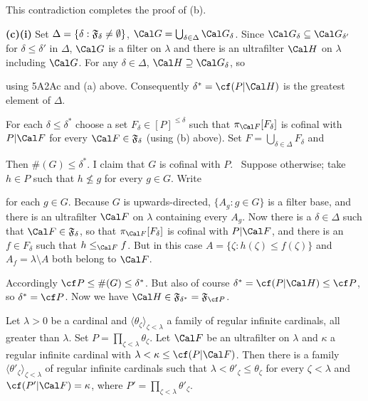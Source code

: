 {This contradiction completes the proof of (b).

\medskip

{\bf (c)(i)} Set $\Delta=\{\delta:\frak F_{\delta}\ne\emptyset\}$,
$\Cal G=\bigcup_{\delta\in\Delta}\Cal G_{\delta}$.   Since
$\Cal G_{\delta}\subseteq\Cal G_{\delta'}$ for $\delta\le\delta'$ in
$\Delta$,
$\Cal G$ is a filter on $\lambda$ and there is an ultrafilter
$\Cal H$ on $\lambda$ including $\Cal G$.   For any
$\delta\in\Delta$, $\Cal H\supseteq\Cal G_{\delta}$, so


\noindent using 5A2Ac and (a) above.   Consequently
$\delta^*=\cf(P|\Cal H)$ is the greatest element of $\Delta$.

\medskip

 For each $\delta\le\delta^*$ choose a set
$F_{\delta}\in[P]^{\le\delta}$ such that $\pi_{\Cal F}[F_{\delta}]$ is
cofinal with
$P|\Cal F$ for every $\Cal F\in\frak F_{\delta}$ (using (b) above).
Set $F=\bigcup_{\delta\in\Delta}F_{\delta}$ and


\noindent Then $\#(G)\le\delta^*$.   I claim that $G$ is cofinal with
$P$.   \Prf\Quer\ Suppose otherwise;  take $h\in P$ such
that $h\not\le g$ for every $g\in G$.   Write


\noindent for each $g\in G$.   Because $G$ is upwards-directed,
$\{A_g:g\in G\}$ is a filter base, and there is an ultrafilter $\Cal
F$
on $\lambda$ containing every $A_g$.   Now there is a
$\delta\in\Delta$
such that $\Cal F\in\frak F_{\delta}$, so that
$\pi_{\Cal F}[F_{\delta}]$
is cofinal with $P|\Cal F$, and there is an $f\in F_{\delta}$
such that $h\le_{\Cal F}f$.   But in this
case $A=\{\zeta:h(\zeta)\le f(\zeta)\}$
and $A_f=\lambda\setminus A$ both belong to $\Cal F$.\ \Bang\Qed

\medskip

Accordingly $\cf P\le\#(G)\le\delta^*$.   But also of course
$\delta^*=\cf(P|\Cal H)\le\cf P$,
so $\delta^*=\cf P$.   Now we
have $\Cal H\in\frak F_{\delta^*}=\frak F_{\cf P}$.
}%

 Let $\lambda>0$ be a cardinal and
$\langle\theta_{\zeta}\rangle_{\zeta<\lambda}$ a family of regular
infinite cardinals, all greater than $\lambda$.   Set
$P=\prod_{\zeta<\lambda}\theta_{\zeta}$.
Let $\Cal F$ be an ultrafilter on $\lambda$
and $\kappa$ a regular
infinite cardinal with $\lambda<\kappa\le\cf(P|\Cal F)$.
Then there is a
family $\langle\theta'_{\zeta}\rangle_{\zeta<\lambda}$ of regular
infinite cardinals such that $\lambda<\theta'_{\zeta}\le\theta_{\zeta}$ for
every $\zeta<\lambda$ and $\cf(P'|\Cal F)=\kappa$, where
$P'=\prod_{\zeta<\lambda}\theta'_{\zeta}$.

